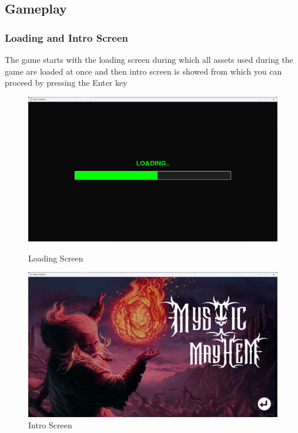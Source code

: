 \documentclass[10.5pt]{article}
\begin{document}
\newpage

\subsection{Gameplay}
\subsubsection{Loading and Intro Screen}
The game starts with the loading screen during which all assets used during the game are loaded at once and then intro screen is showed from which you can proceed by pressing the Enter key
\vspace{0.3cm}
\begin{figure}[h!]
    \centering
    \begin{minipage}[t]{0.45\textwidth}
        \centering
        \includegraphics[width=\textwidth]{loading.png}
        \caption{Loading Screen}
        \label{fig:image1}
    \end{minipage}
    \hfill
    \begin{minipage}[t]{0.45\textwidth}
        \centering
        \includegraphics[width=\textwidth]{intro.png}
        \caption{Intro Screen}
        \label{fig:image2}
    \end{minipage}
\end{figure}
\end{document}
